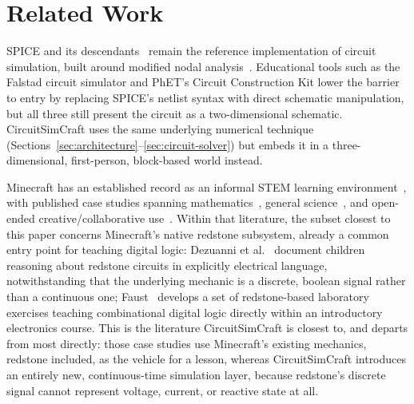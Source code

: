 \section{Related Work}
\label{sec:related-work}

SPICE and its descendants~\cite{nagel1973spice} remain the reference implementation of
circuit simulation, built around modified nodal analysis~\cite{ho1975mna}. Educational tools
such as the Falstad circuit simulator and PhET's Circuit Construction Kit lower the barrier
to entry by replacing SPICE's netlist syntax with direct schematic manipulation, but all
three still present the circuit as a two-dimensional schematic. CircuitSimCraft uses the same
underlying numerical technique (Sections~\ref{sec:architecture}--\ref{sec:circuit-solver})
but embeds it in a three-dimensional, first-person, block-based world instead.

Minecraft has an established record as an informal STEM learning
environment~\cite{nebel2016mining,sitzmann2011meta}, with published case studies spanning
mathematics~\cite{bos2014mathematics}, general science~\cite{short2012teaching}, and
open-ended creative/collaborative use~\cite{cipollone2014creative,callaghan2016investigating}.
Within that literature, the subset closest to this paper concerns Minecraft's native redstone
subsystem, already a common entry point for teaching digital logic: Dezuanni et
al.~\cite{dezuanni2015redstone} document children reasoning about redstone circuits in
explicitly electrical language, notwithstanding that the underlying mechanic is a discrete,
boolean signal rather than a continuous one; Faust~\cite{faust2024minecraft} develops a set of
redstone-based laboratory exercises teaching combinational digital logic directly within an
introductory electronics course. This is the literature CircuitSimCraft is closest
to, and departs from most directly: those case studies use Minecraft's existing mechanics,
redstone included, as the vehicle for a lesson, whereas CircuitSimCraft introduces an entirely
new, continuous-time simulation layer, because redstone's discrete signal cannot represent
voltage, current, or reactive state at all.

